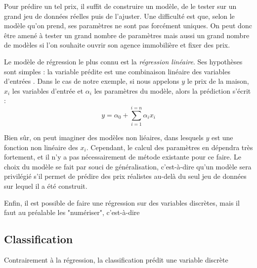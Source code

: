 Pour prédire un tel prix, il suffit de construire un modèle, de le tester sur un grand jeu de données réelles puis de l'ajuster. Une difficulté est que, selon le modèle qu'on prend, ses paramètres ne sont pas forcément uniques. On peut donc être amené à tester un grand nombre de paramètres mais aussi un grand nombre de modèles si l'on souhaite ouvrir son agence immobilière et fixer des prix.

Le modèle de régression le plus connu est la \emph{régression linéaire}. Ses hypothèses sont simples : la variable prédite   est une combinaison linéaire des variables d'entrées .
Dans le cas de notre exemple, si nous appelons $y$ le prix de la maison, $x_i$ les variables d'entrée et $\alpha_i$ les paramètres du modèle, alors la prédiction s'écrit :
$$y = \alpha_0 + \sum_{i = 1}^{i = n}{\alpha_i x_i}$$

Bien sûr, on peut imaginer des modèles non liéaires, dans lesquels $y$ est une fonction non linéaire des $x_i$. Cependant, le calcul des paramètres en dépendra très fortement, et il n'y a pas nécessairement de métode existante pour ce faire. Le choix du modèle se fait par souci de généralisation, c'est-à-dire qu'un modèle sera privilégié s'il permet de prédire des prix réalistes au-delà du seul jeu de données sur lequel il a été construit.

Enfin, il est possible de faire une régression sur des variables discrètes, mais il faut au préalable les "numériser", c'est-à-dire 

\subsection{Classification} 
Contrairement à la régression, la classification prédit une variable discrète
